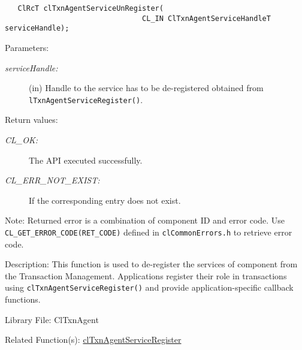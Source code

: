 \begin{flushleft}
\begin{Desc}
\footnotesize\begin{verbatim}   ClRcT clTxnAgentServiceUnRegister(
                          		CL_IN ClTxnAgentServiceHandleT serviceHandle); 
\end{verbatim}
\normalsize
\end{Desc}
\begin{Desc}
\item[Parameters:]
\begin{description}
\item[{\em service\-Handle:}](in) Handle to the service has to be de-registered obtained from {\tt{lTxnAgentServiceRegister()}}.\end{description}
\end{Desc}
\begin{Desc}
\item[Return values:]
\begin{description}
\item[{\em CL\_\-OK:}]The API executed successfully. \item[{\em CL\_\-ERR\_\-NOT\_\-EXIST:}]If the corresponding entry does not exist.\end{description}
\end{Desc}
\begin{Desc}
\item[Note:]Returned error is a combination of component ID and error code. Use {\tt{CL\_\-GET\_\-ERROR\_\-CODE(RET\_\-CODE)}} defined in 
{\tt{clCommonErrors.h}} to retrieve error code.
\end{Desc}
\begin{Desc}
\item[Description:]This function is used to de-register the services of component from the Transaction Management. Applications register their role in
transactions using {\tt{clTxnAgentServiceRegister()}} and provide application-specific callback functions.\end{Desc}
\begin{Desc}
\item[Library File:]Cl\-Txn\-Agent\end{Desc}
\begin{Desc}
\item[Related Function(s):]\hyperlink{pagetxn203}{cl\-Txn\-Agent\-Service\-Register} \end{Desc}
\newpage





\end{flushleft}
